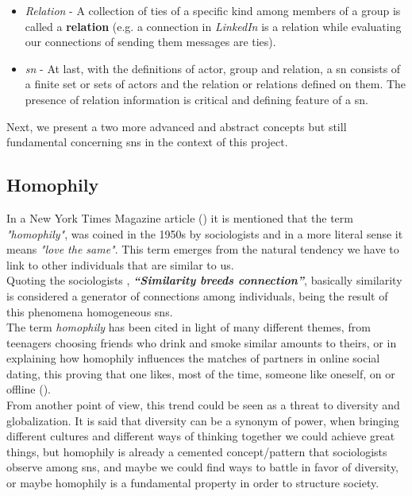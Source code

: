 \begin{itemize}
    \item \emph{Relation} - A collection of ties of a specific kind among members of a group is called a \textbf{relation} (e.g. a connection in \textit{LinkedIn} is a relation while evaluating our connections of sending them messages are ties).
    \item \emph{\gls{sn}} - At last, with the definitions of actor, group and relation, a \gls{sn} consists of a finite set or sets of actors and the relation or relations defined on them. The presence of relation information is critical and defining feature of a \gls{sn}.
\end{itemize}

Next, we present a two more advanced and abstract concepts but still fundamental concerning \glspl{sn} in the context of this project.

\subsection*{Homophily}

In a New York Times Magazine article (\cite{nytmagazinehomop}) it is mentioned that the term \textit{"homophily"}, was coined in the 1950s by sociologists and in a more literal sense it means \textit{"love the same"}. This term emerges from the natural tendency we have to link to other individuals that are similar to us.\\
\indent Quoting the sociologists \cite{mcpherson2001birds}, \textbf{\textit{“Similarity breeds connection”}}, basically similarity is considered a generator of connections among individuals, being the result of this phenomena homogeneous \glspl{sn}.\\
\indent The term \textit{homophily} has been cited in light of many different themes, from teenagers choosing friends who drink and smoke similar amounts to theirs, or in explaining how homophily influences the matches of partners in online social dating, this proving that one likes, most of the time, someone like oneself, on or offline (\cite{fiore2005homophily}).\\
\indent From another point of view, this trend could be seen as a threat to diversity and globalization. It is said that diversity can be a synonym of power, when bringing different cultures and different ways of thinking together we could achieve great things, but homophily is already a cemented concept/pattern that sociologists observe among \glspl{sn}, and maybe we could find ways to battle in favor of diversity, or maybe homophily is a fundamental property in order to structure society.

